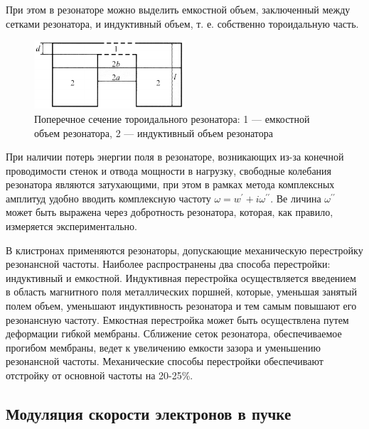 При этом в резонаторе можно выделить емкостной объем, заключенный между сетками резонатора, и индуктивный объем, т. е. собственно тороидальную часть.

\begin{figure}[H]
	\centering
	\includegraphics[width=0.5\textwidth]{text/fig2}
	\caption{Поперечное сечение тороидального резонатора: 1 — емкостной объем резонатора, 2 — индуктивный объем резонатора}
	\label{fig:2}
\end{figure}

При наличии потерь энергии поля в резонаторе, возникающих из-за конечной проводимости стенок и отвода мощности в нагрузку, свободные колебания резонатора являются затухающими, при этом в рамках метода комплексных амплитуд удобно вводить комплексную частоту $\omega = w^{\prime}+i\omega ^{\prime \prime}$. Ве­
личина $\omega ^{ \prime \prime }$ может быть выражена через добротность резонатора, которая, как правило, измеряется экспериментально.

В клистронах применяются резонаторы, допускающие механическую перестройку резонансной частоты. Наиболее распространены два способа перестройки: индуктивный и емкостной. Индуктивная перестройка осуществляется введением в область магнитного поля металлических поршней, кото­рые, уменьшая занятый полем объем, уменьшают индуктивность резонатора и тем самым повышают его резонансную частоту. Емкостная перестройка может быть осуществлена путем деформации гибкой мембраны. Сближение сеток резонатора, обеспечиваемое прогибом мембраны, ведет к увеличению емкости зазора и уменьшению резонансной частоты. Механические способы перестройки обеспечивают отстройку от основной частоты на 20-25\%.

\subsection{Модуляция скорости электронов в пучке}

